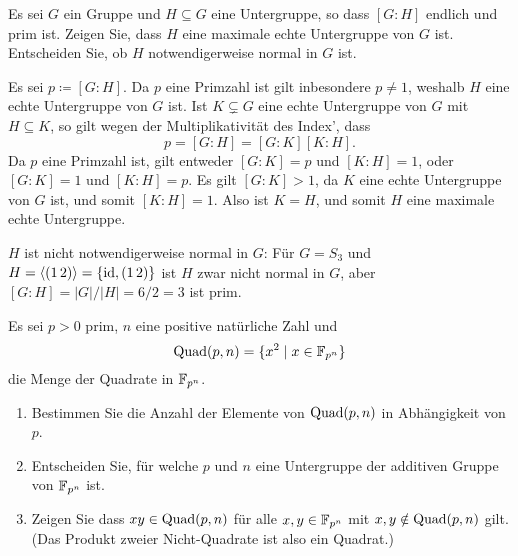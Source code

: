 \begin{question}[subtitle = Ein Kriterium für maximale Untergruppen]
  Es sei $G$ ein Gruppe und $H \subseteq G$ eine Untergruppe, so dass $[G : H]$ endlich und prim ist.
  Zeigen Sie, dass $H$ eine maximale echte Untergruppe von $G$ ist. Entscheiden Sie, ob $H$ notwendigerweise normal in $G$ ist.
\end{question}


\begin{solution}
  Es sei $p \coloneqq [G : H]$.
  Da $p$ eine Primzahl ist gilt inbesondere $p \neq 1$, weshalb $H$ eine echte Untergruppe von $G$ ist.
  Ist $K \subsetneq G$ eine echte Untergruppe von $G$ mit $H \subseteq K$, so gilt wegen der Multiplikativität des Index’, dass 
  \[
      p
    = [G : H]
    = [G : K] [K : H].
  \]
  Da $p$ eine Primzahl ist, gilt entweder $[G : K] = p$ und $[K : H] = 1$, oder $[G : K] = 1$ und $[K : H] = p$.
  Es gilt $[G : K] > 1$, da $K$ eine echte Untergruppe von $G$ ist, und somit $[K : H] = 1$.
  Also ist $K = H$, und somit $H$ eine maximale echte Untergruppe.
  
  $H$ ist nicht notwendigerweise normal in $G$:
  Für $G = S_3$ und $H = \left\langle (1\,2) \right\rangle = \{\operatorname{id}, (1\,2)\}$ ist $H$ zwar nicht normal in $G$, aber $[G : H] = |G|/|H| = 6/2 = 3$ ist prim.
\end{solution}


\begin{question}[subtitle = Quadrate in endlichen Körpern]
  Es sei $p > 0$ prim, $n$ eine positive natürliche Zahl und
  \[
    \operatorname{Quad}(p,n) = \{x^2 \mid x \in \mathbb{F}_{p^n}\}
  \]
  die Menge der Quadrate in $\mathbb{F}_{p^n}$.
  \begin{enumerate}
    \item
      Bestimmen Sie die Anzahl der Elemente von $\operatorname{Quad}(p,n)$ in Abhängigkeit von $p$.
    \item
      Entscheiden Sie, für welche $p$ und $n$ eine Untergruppe der additiven Gruppe von $\mathbb{F}_{p^n}$ ist.
    \item
      Zeigen Sie dass $xy \in \operatorname{Quad}(p,n)$ für alle $x, y \in \mathbb{F}_{p^n}$ mit $x, y \notin \operatorname{Quad}(p,n)$ gilt.
      (Das Produkt zweier Nicht-Quadrate ist also ein Quadrat.)
  \end{enumerate}
\end{question}


